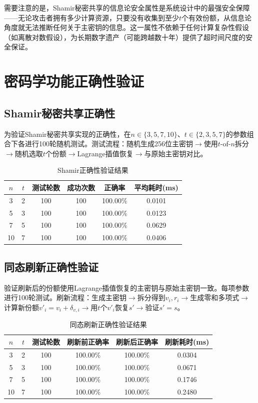 \documentclass[UTF8,a4paper,zihao=-4,openany]{ctexrep}
\begin{document}
需要注意的是，Shamir秘密共享的信息论安全属性是系统设计中的最强安全保障——无论攻击者拥有多少计算资源，只要没有收集到至少$t$个有效份额，从信息论角度就无法推断任何关于主密钥的信息。这一属性不依赖于任何计算复杂性假设（如离散对数假设），为长期数字遗产（可能跨越数十年）提供了超时间尺度的安全保证。

\section{密码学功能正确性验证}

\subsection{Shamir秘密共享正确性}

为验证Shamir秘密共享实现的正确性，在$n \in \{3, 5, 7, 10\}$、$t \in \{2, 3, 5, 7\}$的参数组合下各进行100轮随机测试。测试流程：随机生成256位主密钥$\to$使用$t$-of-$n$拆分$\to$随机选取$t$个份额$\to$Lagrange插值恢复$\to$与原始主密钥对比。

\begin{table}[htbp]
\centering
\caption{Shamir正确性验证结果}
\label{tab:shamir_test}
\begin{tabularx}{\textwidth}{cccccc}
\toprule
$n$ & $t$ & 测试轮数 & 成功次数 & 正确率 & 平均耗时(ms)\\
\midrule
3 & 2 & 100 & 100 & 100.00\% & 0.0101\\
5 & 3 & 100 & 100 & 100.00\% & 0.0123\\
7 & 5 & 100 & 100 & 100.00\% & 0.0629\\
10 & 7 & 100 & 100 & 100.00\% & 0.0406\\
\bottomrule
\end{tabularx}
\end{table}

\subsection{同态刷新正确性验证}

验证刷新后的份额使用Lagrange插值恢复的主密钥与原始主密钥一致。每项参数进行100轮测试。刷新流程：生成主密钥$\to$拆分得到$v_i,r_i$$\to$生成零和多项式$\to$计算新份额$v'_i = v_i + \delta_{v,i}$$\to$用$t$个$v'_i$恢复$s'$$\to$验证$s' = s$。

\begin{table}[htbp]
\centering
\caption{同态刷新正确性验证结果}
\label{tab:refresh_test}
\begin{tabularx}{\textwidth}{cccccc}
\toprule
$n$ & $t$ & 测试轮数 & 刷新前正确率 & 刷新后正确率 & 刷新耗时(ms)\\
\midrule
3 & 2 & 100 & 100.00\% & 100.00\% & 0.0304\\
5 & 3 & 100 & 100.00\% & 100.00\% & 0.0671\\
7 & 5 & 100 & 100.00\% & 100.00\% & 0.1746\\
10 & 7 & 100 & 100.00\% & 100.00\% & 0.2480\\
\bottomrule
\end{tabularx}
\end{table}
\end{document}
